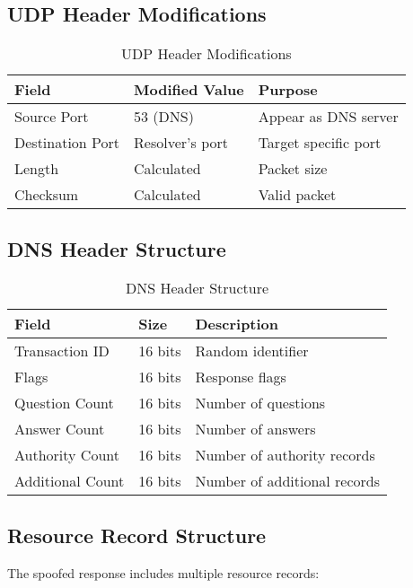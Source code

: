 \documentclass[12pt,a4paper]{article}
\begin{document}
\subsection{UDP Header Modifications}

\begin{table}[H]
\centering
\begin{tabular}{|l|l|l|}
\hline
\textbf{Field} & \textbf{Modified Value} & \textbf{Purpose} \\
\hline
Source Port & 53 (DNS) & Appear as DNS server \\
Destination Port & Resolver's port & Target specific port \\
Length & Calculated & Packet size \\
Checksum & Calculated & Valid packet \\
\hline
\end{tabular}
\caption{UDP Header Modifications}
\label{tab:udp_header}
\end{table}

\subsection{DNS Header Structure}

\begin{table}[H]
\centering
\begin{tabular}{|l|l|l|}
\hline
\textbf{Field} & \textbf{Size} & \textbf{Description} \\
\hline
Transaction ID & 16 bits & Random identifier \\
Flags & 16 bits & Response flags \\
Question Count & 16 bits & Number of questions \\
Answer Count & 16 bits & Number of answers \\
Authority Count & 16 bits & Number of authority records \\
Additional Count & 16 bits & Number of additional records \\
\hline
\end{tabular}
\caption{DNS Header Structure}
\label{tab:dns_header}
\end{table}

\subsection{Resource Record Structure}

The spoofed response includes multiple resource records:
\end{document}
